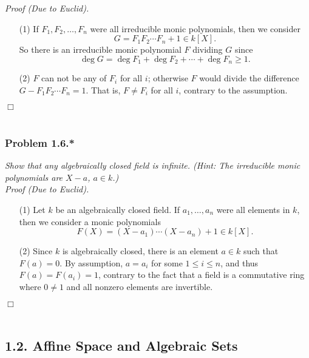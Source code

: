 \documentclass{article}
\begin{document}
\emph{Proof (Due to Euclid).}
\begin{enumerate}
\item[(1)]
  If
  $F_1, F_2, \ldots, F_n$ were all irreducible monic polynomials, then
  we consider
  \[
    G = F_1 F_2 \cdots F_n + 1 \in k[X].
  \]
  So there is an irreducible monic polynomial $F$ dividing $G$
  since
  \[
    \deg G = \deg F_1 + \deg F_2 + \cdots + \deg F_n \geq 1.
  \]

\item[(2)]
  $F$ can not be any of $F_i$ for all $i$;
  otherwise $F$ would divide the difference $G - F_1 F_2 \cdots F_n = 1$.
  That is, $F \neq F_i$ for all $i$, contrary to the assumption.
\end{enumerate}
$\Box$\\\\






\subsubsection*{Problem 1.6.*}
\emph{Show that any algebraically closed field is infinite.
(Hint: The irreducible monic polynomials are $X - a$, $a \in k$.)} \\

\emph{Proof (Due to Euclid).}
\begin{enumerate}
\item[(1)]
  Let $k$ be an algebraically closed field.
  If $a_1, \ldots, a_n$ were all elements in $k$, then
  we consider a monic polynomials
  \[
    F(X) = (X - a_1) \cdots (X - a_n) + 1 \in k[X].
  \]

\item[(2)]
  Since $k$ is algebraically closed,
  there is an element $a \in k$ such that $F(a) = 0$.
  By assumption, $a = a_i$ for some $1 \leq i \leq n$,
  and thus $F(a) = F(a_i) = 1$, contrary to the fact that
  a field is a commutative ring where $0 \neq 1$ and all nonzero elements are invertible.
\end{enumerate}
$\Box$\\\\






\subsection*{1.2. Affine Space and Algebraic Sets \\}
\end{document}
